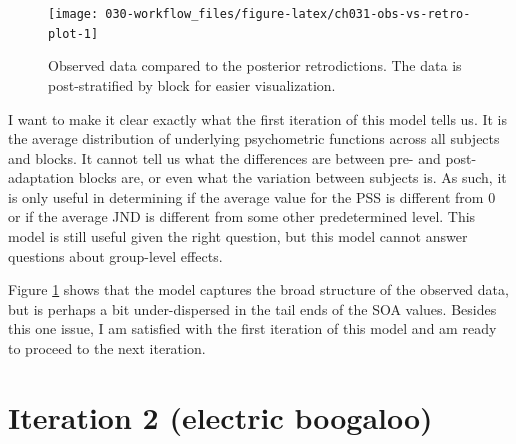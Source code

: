 \documentclass[11pt, oneside, openany]{scrbook}
\newenvironment{Shaded}{\begin{snugshade}}{\end{snugshade}}
\newcommand{\DataTypeTok}[1]{\textcolor[rgb]{0.13,0.29,0.53}{#1}}
\newcommand{\KeywordTok}[1]{\textcolor[rgb]{0.13,0.29,0.53}{\textbf{#1}}}
\newcommand{\NormalTok}[1]{#1}
\newcommand{\OperatorTok}[1]{\textcolor[rgb]{0.81,0.36,0.00}{\textbf{#1}}}
\newcommand{\OtherTok}[1]{\textcolor[rgb]{0.56,0.35,0.01}{#1}}
\newcommand{\StringTok}[1]{\textcolor[rgb]{0.31,0.60,0.02}{#1}}
\begin{document}
\begin{Shaded}
\end{Shaded}


\begin{figure}

{\centering \texttt{[image: 030-workflow\_files/figure-latex/ch031-obs-vs-retro-plot-1]} 

}

\caption{Observed data compared to the posterior retrodictions. The data is post-stratified by block for easier visualization.}\label{fig:ch031-obs-vs-retro-plot}
\end{figure}

I want to make it clear exactly what the first iteration of this model tells us. It is the average distribution of underlying psychometric functions across all subjects and blocks. It cannot tell us what the differences are between pre- and post-adaptation blocks are, or even what the variation between subjects is. As such, it is only useful in determining if the average value for the PSS is different from 0 or if the average JND is different from some other predetermined level. This model is still useful given the right question, but this model cannot answer questions about group-level effects.

Figure \ref{fig:ch031-obs-vs-retro-plot} shows that the model captures the broad structure of the observed data, but is perhaps a bit under-dispersed in the tail ends of the SOA values. Besides this one issue, I am satisfied with the first iteration of this model and am ready to proceed to the next iteration.

\hypertarget{iter2}{%
\section{Iteration 2 (electric boogaloo)}\label{iter2}}
\end{document}

